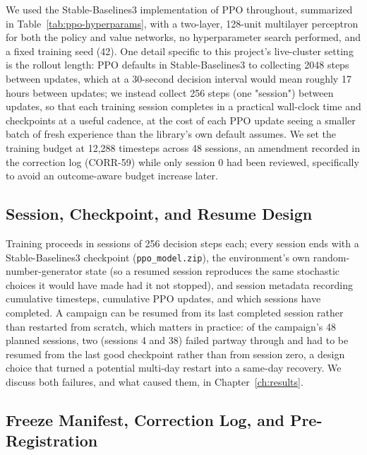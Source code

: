 We used the Stable-Baselines3 implementation of PPO \cite{raffin2021sb3}
throughout, summarized in Table~\ref{tab:ppo-hyperparams}, with a two-layer,
128-unit multilayer perceptron for both the policy and value networks, no
hyperparameter search performed, and a fixed training seed (42). One detail
specific to this project's live-cluster setting is the rollout length: PPO
defaults in Stable-Baselines3 to collecting 2048 steps between updates,
which at a 30-second decision interval would mean roughly 17 hours between
updates; we instead collect 256 steps (one "session") between updates, so
that each training session completes in a practical wall-clock time and
checkpoints at a useful cadence, at the cost of each PPO update seeing a
smaller batch of fresh experience than the library's own default assumes.
We set the training budget at 12,288 timesteps across 48 sessions, an
amendment recorded in the correction log (CORR-59) while only session 0 had
been reviewed, specifically to avoid an outcome-aware budget increase later.

\begin{table}[H]
\centering
\caption[PPO hyperparameters]{PPO hyperparameters used for training.}
\label{tab:ppo-hyperparams}

\end{table}

\subsection{Session, Checkpoint, and Resume Design}

Training proceeds in sessions of 256 decision steps each; every session
ends with a Stable-Baselines3 checkpoint (\texttt{ppo\_\allowbreak model.zip}), the
environment's own random-number-generator state (so a resumed session
reproduces the same stochastic choices it would have made had it not
stopped), and session metadata recording cumulative timesteps, cumulative
PPO updates, and which sessions have completed. A campaign can be resumed
from its last completed session rather than restarted from scratch, which
matters in practice: of the campaign's 48 planned sessions, two (sessions 4
and 38) failed partway through and had to be resumed from the last good
checkpoint rather than from session zero, a design choice that turned a
potential multi-day restart into a same-day recovery. We discuss both
failures, and what caused them, in Chapter~\ref{ch:results}.

\subsection{Freeze Manifest, Correction Log, and Pre-Registration}

